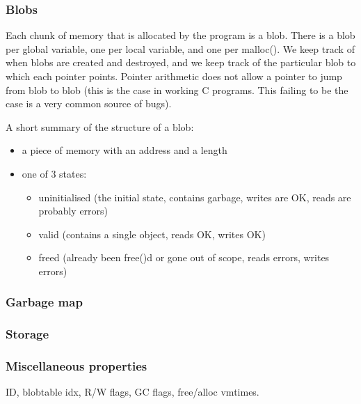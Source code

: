 \subsubsection{Blobs}
Each chunk of memory that is allocated by the program is a blob. There is a blob per global variable, one per local variable, and one per malloc(). We keep track of when blobs are created and destroyed, and we keep track of the particular blob to which each pointer points. Pointer arithmetic does not allow a pointer to jump from blob to blob (this is the case in working C programs. This failing to be the case is a very common source of bugs).
\par
A short summary of the structure of a blob:
\begin{itemize}
\item a piece of memory with an address and a length
\item one of 3 states:
  \begin{itemize}
  \item uninitialised (the initial state, contains garbage, writes are OK, reads are probably errors)
  \item valid (contains a single object, reads OK, writes OK)
  \item freed (already been free()d or gone out of scope, reads errors, writes errors) 
  \end{itemize}
\end{itemize}
\subsubsection{Garbage map}
\subsubsection{Storage}
\subsubsection{Miscellaneous properties}
ID, blobtable idx, R/W flags, GC flags, free/alloc vmtimes.

